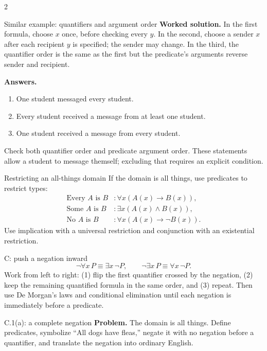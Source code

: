 \documentclass[10pt]{article}
\begin{document}
\begin{multicols}{2}
\begin{workedbox}{Similar example: quantifiers and argument order}
\textbf{Worked solution.} In the first formula, choose $x$ once, before
checking every $y$. In the second, choose a sender $x$ after each recipient
$y$ is specified; the sender may change. In the third, the quantifier order is
the same as the first but the predicate's arguments reverse sender and recipient.

\textbf{Answers.}
\begin{enumerate}
\item One student messaged every student.
\item Every student received a message from at least one student.
\item One student received a message from every student.
\end{enumerate}
Check both quantifier order and predicate argument order. These statements
allow a student to message themself; excluding that requires an explicit condition.
\end{workedbox}


\begin{definitionbox}{Restricting an all-things domain}
If the domain is all things, use predicates to restrict types:
\[
\begin{aligned}
\text{Every }A\text{ is }B &: \forall x(A(x)\to B(x)),\\
\text{Some }A\text{ is }B &: \exists x(A(x)\land B(x)),\\
\text{No }A\text{ is }B &: \forall x(A(x)\to\neg B(x)).
\end{aligned}
\]
Use implication with a universal restriction and conjunction with an
existential restriction.
\end{definitionbox}

\begin{methodbox}{C: push a negation inward}
\[
\neg\forall x\,P\equiv\exists x\,\neg P,
\qquad
\neg\exists x\,P\equiv\forall x\,\neg P.
\]
Work from left to right: (1) flip the first quantifier crossed by the negation,
(2) keep the remaining quantified formula in the same order, and (3) repeat.
Then use De Morgan's laws and conditional elimination until each negation is
immediately before a predicate.
\end{methodbox}

\begin{workedbox}{C.1(a): a complete negation}
\textbf{Problem.} The domain is all things. Define predicates, symbolize
``All dogs have fleas,'' negate it with no negation before a quantifier, and
translate the negation into ordinary English.


\end{workedbox}
\end{multicols}
\end{document}
